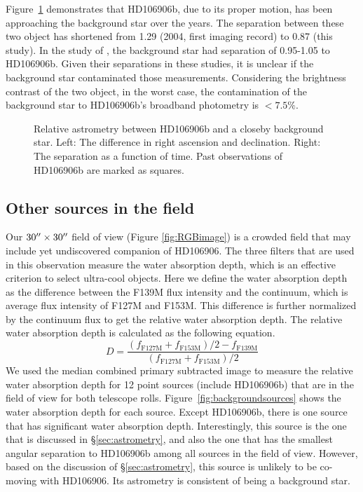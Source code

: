 \documentclass[modern]{aastex62}
\begin{document}
Figure~\ref{fig:astrometry:bck} demonstrates that HD106906b, due to its proper motion, has been approaching  the background star over the years. The separation between these two object has shortened from 1\arcsec.29 (2004, first imaging record) to 0\arcsec.87 (this study). In the study of \citep{Bailey2013, Wu2016, Daemgen2017}, the background star had separation of 0.95-1.05 to HD106906b. Given their separations in these studies, it is unclear if the background star contaminated those measurements. Considering the brightness contrast of the two object, in the worst case, the contamination of the background star to HD106906b's broadband photometry is  $<7.5\%$.

\begin{figure}
  \centering
  \caption{Relative astrometry between HD106906b and a closeby background star. Left: The difference in right ascension and declination. Right: The separation as a function of time. Past observations of HD106906b are marked as squares.}
  \label{fig:astrometry:bck}
\end{figure}

\subsection{Other sources in the field}
Our $30\mbox{$^{\prime\prime}$}\times30\mbox{$^{\prime\prime}$}$ field of view (Figure \ref{fig:RGBimage}) is a crowded field that may include yet undiscovered companion of HD106906. The three filters that are used in this observation measure the water absorption depth, which is an effective criterion to select ultra-cool objects. Here we define the water absorption depth as the difference between the F139M flux intensity and the continuum, which is average flux intensity of F127M and F153M. This difference is further normalized by the continuum flux to get the relative water absorption depth. The relative water absorption depth is calculated as the following equation.
\begin{equation}
D = \frac{(f_{\mathrm{F127M}} + f_\mathrm{F153M})/2 - f_{\mathrm{F139M}}}{(f_{\mathrm{F127M}} + f_\mathrm{{F153M}})/2}
\end{equation}
We used the median combined primary subtracted image to measure the relative water absorption depth for 12 point sources (include HD106906b) that are in the field of view for both telescope rolls. Figure~\ref{fig:backgroundsources} shows the water absorption depth for each source. Except HD106906b, there is one source that has significant water absorption depth. Interestingly, this source is the one that is discussed in \S\ref{sec:astrometry}, and also the one that has the smallest angular separation to HD106906b among all sources in the field of view. However, based on the discussion of \S\ref{sec:astrometry}, this source is unlikely to be co-moving with HD106906. Its astrometry is consistent of being a background star.
\end{document}
